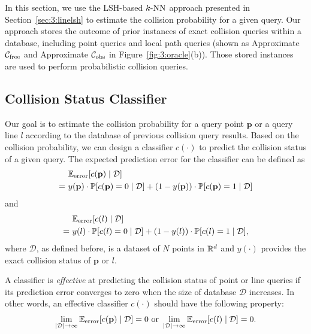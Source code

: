 In this section, we use the LSH-based $k\text{-NN}$ approach presented in Section~\ref{sec:3:linelsh} to estimate the collision probability for a given query.
Our approach stores the outcome of prior instances of exact collision queries within a database, including point queries and local path queries (shown as Approximate $\mathcal C_{\text{free}}$ and Approximate $\mathcal C_{\text{obs}}$ in Figure~\ref{fig:3:oracle}(b)). Those stored instances are used to perform probabilistic collision queries.

\subsection{Collision Status Classifier}
\label{subsec:3:knnreasoning:classifier}

Our goal is to estimate the collision probability for a query point $\mathbf p$ or a query line $l$ according to the database of previous collision query results. Based on the collision probability, we can design a classifier $c(\cdot)$ to predict the collision status of a given query. The expected prediction error for the classifier can be defined as
\begin{align}
& \ \mathbb E_{\text{error}}[c(\mathbf p) \mid \mathcal D]  \notag \\
=& \ y(\mathbf p) \cdot \mathbb P[c(\mathbf p) = 0 \mid \mathcal D] + (1 - y(\mathbf p)) \cdot \mathbb P[c(\mathbf p) = 1 \mid \mathcal D] \notag
\end{align}
and
\begin{align}
&\ \mathbb E_{\text{error}}[c(l) \mid \mathcal D] \notag \\
=& \ y(l) \cdot \mathbb P[c(l) = 0 \mid \mathcal D] + (1 - y(l)) \cdot \mathbb P[c(l) = 1 \mid \mathcal D], \notag
\end{align}
where $\mathcal D$, as defined before, is a dataset of $N$ points in $\mathbb R^d$ and $y(\cdot)$ provides the exact collision status of $\mathbf p$ or $l$.

A classifier is \emph{effective} at predicting the collision status of point or line queries if its prediction error converges to zero when the size
of database $\mathcal D$ increases. In other words, an effective classifier $c(\cdot)$ should have the following property:
\begin{equation}
\lim_{|\mathcal D| \rightarrow \infty} \mathbb E_{\text{error}}[c(\mathbf p) \mid \mathcal D] = 0 \text{ or }
\lim_{|\mathcal D| \rightarrow \infty} \mathbb E_{\text{error}}[c(l) \mid \mathcal D] = 0. \notag
\end{equation}

